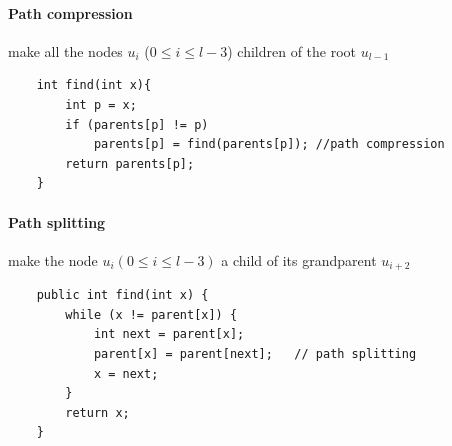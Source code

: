 \documentclass{article}
\begin{document}
\paragraph{Path compression} \cite{hopcroft1973set} make all the nodes $u_i$ ($ 0 \leq i \leq l-3$) children of the root $u_{l-1}$
\begin{lstlisting}
    int find(int x){
        int p = x;
        if (parents[p] != p)
            parents[p] = find(parents[p]); //path compression
        return parents[p];
    }
\end{lstlisting}
\paragraph{Path splitting} \cite{van1977alternative} \cite{van1980datastructures} make the node $u_i (0 \leq i \leq l-3)$ a child of its grandparent $u_{i+2}$ 
\begin{lstlisting}
    public int find(int x) {
        while (x != parent[x]) {
            int next = parent[x];
            parent[x] = parent[next];   // path splitting
            x = next;
        }
        return x;
    }
\end{lstlisting}
\end{document}
